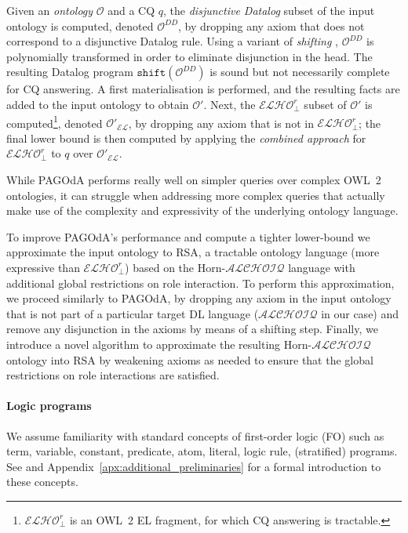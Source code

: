 \documentclass[runningheads]{llncs}
\newcommand{\alchoiq}{$\mathcal{ALCHOIQ}$\xspace}
\newcommand{\hornalchoiq}{Horn-\alchoiq\xspace}
\newcommand{\elho}{$\mathcal{ELHO}^r_\bot$\xspace}
\newcommand{\pagoda}{\mbox{PAGOdA}\xspace}
\newcommand{\datalog}{\mbox{Datalog}\xspace}
\begin{document}
Given an \emph{ontology} $\mathcal{O}$ and a CQ $q$, the \emph{disjunctive \datalog} subset of the input ontology is computed, denoted $\mathcal{O}^{DD}$, by dropping any axiom that does not correspond to a disjunctive \datalog rule.
Using a variant of \emph{shifting} \cite{eiter2004}, $\mathcal{O}^{DD}$ is polynomially transformed in order to eliminate disjunction in the head.
The resulting \datalog program $\texttt{shift}(\mathcal{O}^{DD})$ is sound but not necessarily complete for CQ answering.
A first materialisation is performed, and the resulting facts are added to the input ontology to obtain $\mathcal{O}'$.
Next, the \elho\cite{stefanoni2014} subset of $\mathcal{O}'$ is computed\footnote{\elho is an OWL~2 EL fragment, for which CQ answering is tractable.}, denoted $\mathcal{O'_{EL}}$, by dropping any axiom that is not in \elho;
the final lower bound is then computed by applying the \emph{combined approach} for \elho\cite{lutz2009,stefanoni2013} to $q$ over $\mathcal{O'_{EL}}$.

While \pagoda performs really well on simpler queries over complex OWL~2 ontologies, it can struggle when addressing more complex queries that actually make use of the complexity and expressivity of the underlying ontology language.

To improve \pagoda's performance and compute a tighter lower-bound we approximate the input ontology to RSA, a tractable ontology language (more expressive than \elho) based on the \hornalchoiq language with additional global restrictions on role interaction.
To perform this approximation, we proceed similarly to \pagoda, by dropping any axiom in the input ontology that is not part of a particular target DL language (\alchoiq in our case) and remove any disjunction in the axioms by means of a shifting step.
Finally, we introduce a novel algorithm to approximate the resulting \hornalchoiq ontology into RSA by weakening axioms as needed to ensure that the global restrictions on role interactions are satisfied.

\paragraph*{Logic programs}\label{par:logic_programs}

We assume familiarity with standard concepts of first-order logic (FO) such as term, variable, constant, predicate, atom, literal, logic rule, (stratified) programs.
See \cite{feier2015} and Appendix~\ref{apx:additional_preliminaries} for a formal introduction to these concepts.
\end{document}
